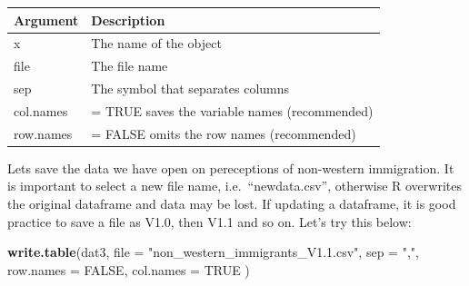 \documentclass[]{article}
\newenvironment{Shaded}{\begin{snugshade}}{\end{snugshade}}
\newcommand{\DataTypeTok}[1]{\textcolor[rgb]{0.13,0.29,0.53}{#1}}
\newcommand{\KeywordTok}[1]{\textcolor[rgb]{0.13,0.29,0.53}{\textbf{#1}}}
\newcommand{\NormalTok}[1]{#1}
\newcommand{\OtherTok}[1]{\textcolor[rgb]{0.56,0.35,0.01}{#1}}
\newcommand{\StringTok}[1]{\textcolor[rgb]{0.31,0.60,0.02}{#1}}
\begin{document}
\begin{longtable}[]{@{}ll@{}}
\toprule
Argument & Description\tabularnewline
\midrule
\endhead
x & The name of the object\tabularnewline
file & The file name\tabularnewline
sep & The symbol that separates columns\tabularnewline
col.names & = TRUE saves the variable names (recommended)\tabularnewline
row.names & = FALSE omits the row names (recommended)\tabularnewline
\bottomrule
\end{longtable}

Lets save the data we have open on pereceptions of non-western immigration. It is important to select a new file name, i.e.~``newdata.csv'', otherwise R overwrites the original dataframe and data may be lost. If updating a dataframe, it is good practice to save a file as V1.0, then V1.1 and so on. Let's try this below:

\begin{Shaded}
\begin{Highlighting}[]
\KeywordTok{write.table}\NormalTok{(dat3, }
            \DataTypeTok{file =} \StringTok{"non_western_immigrants_V1.1.csv"}\NormalTok{,}
            \DataTypeTok{sep =} \StringTok{","}\NormalTok{,}
            \DataTypeTok{row.names =} \OtherTok{FALSE}\NormalTok{,}
            \DataTypeTok{col.names =} \OtherTok{TRUE}
\NormalTok{)}
\end{Highlighting}
\end{Shaded}
\end{document}

